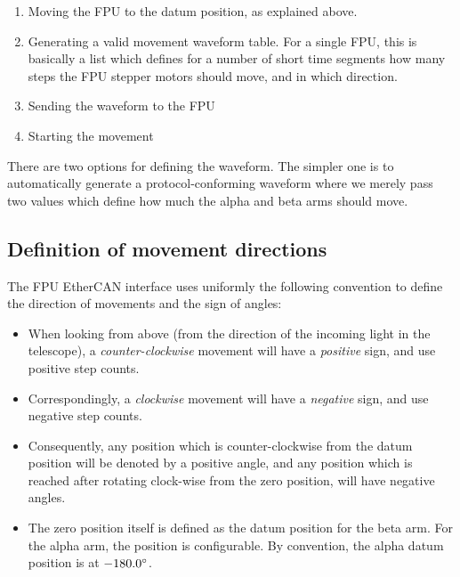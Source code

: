 \documentclass[fontsize=12,a4paper]{scrreprt}
\begin{document}
\begin{enumerate}
\item Moving the FPU to the datum position, as explained above.

\item Generating a valid movement waveform table. For a single FPU,
  this is basically a list which defines for a number of short time
  segments how many steps the FPU stepper motors should move, and in
  which direction.

\item Sending the waveform to the FPU
\item Starting the movement

\end{enumerate}

There are two options for defining the waveform. The simpler one is to
automatically generate a protocol-conforming waveform where we merely
pass two values which define how much the alpha and beta arms should
move.

\subsection{Definition of movement directions}

The FPU EtherCAN interface uses uniformly the following convention
to define the direction of movements and the sign of
angles:

\begin{itemize}
  \item When looking from above (from the direction of the incoming
    light in the telescope), a \emph{counter-clockwise} movement will
    have a \emph{positive} sign, and use positive step counts.
  \item Correspondingly, a \emph{clockwise} movement will have a
    \emph{negative} sign, and use negative step counts.
  \item Consequently, any position which is counter-clockwise from the
    datum position will be denoted by a positive angle, and any
    position which is reached after rotating clock-wise from the zero
    position, will have negative angles.
  \item The zero position itself is defined as the datum position for
    the beta arm. For the alpha arm, the position is configurable. By
    convention, the alpha datum position is at $-180.0\degree$.
\end{itemize}
\end{document}
